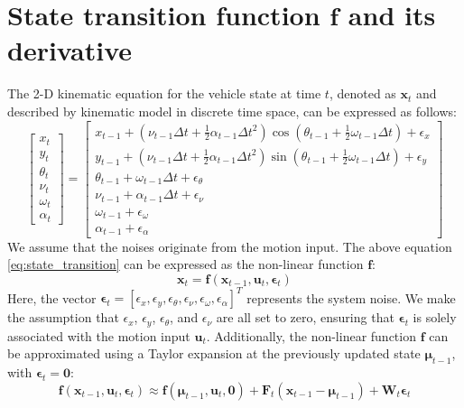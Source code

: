 \documentclass[12pt, a4paper]{article}
\begin{document}
\section{State transition function $\bm{f}$ and its derivative}
The 2-D kinematic equation for the vehicle state at time $t$, denoted as $\bm{x}_t$ and described by kinematic model in discrete time space, can be expressed as follows:
\begin{equation}
  \label{eq:state_transition}
  \begin{bmatrix}
    x_{t}\\
    y_{t}\\
    \theta_{t}\\
    \nu_{t}\\
    \omega_{t}\\
    \alpha_{t}
  \end{bmatrix}=
  \begin{bmatrix}
    x_{t-1} + (\nu_{t-1}\Delta t + \frac{1}{2}\alpha_{t-1}\Delta t^2) \cos(\theta_{t-1}+\frac{1}{2}\omega_{t-1}\Delta t) + \epsilon_{x}\\
    y_{t-1} + (\nu_{t-1}\Delta t + \frac{1}{2}\alpha_{t-1}\Delta t^2) \sin(\theta_{t-1}+\frac{1}{2}\omega_{t-1}\Delta t) + \epsilon_{y}\\
    \theta_{t-1} + \omega_{t-1}\Delta t + \epsilon_{\theta}\\
    \nu_{t-1} + \alpha_{t-1} \Delta t + \epsilon_{\nu}\\
    \omega_{t-1}+\epsilon_{\omega}\\
    \alpha_{t-1}+\epsilon_{\alpha}
  \end{bmatrix}
\end{equation}
We assume that the noises originate from the motion input. The above equation \eqref{eq:state_transition} can be expressed as the non-linear function $\bm{f}$:
\[
  \bm{x}_{t} = \bm{f}(\bm{x}_{t-1}, \bm{u}_{t},\bm{\epsilon}_{t})
\]
Here, the vector $\bm{\epsilon}_{t}=[\epsilon_{x}, \epsilon_{y}, \epsilon_{\theta}, \epsilon_{\nu}, \epsilon_{\omega}, \epsilon_{\alpha}]^{T}$ represents the system noise. We make the assumption that $\epsilon_{x}$, $\epsilon_{y}$, $\epsilon_{\theta}$, and $\epsilon_{\nu}$ are all set to zero, ensuring that $\bm{\epsilon}_{t}$ is solely associated with the motion input $\bm{u}_{t}$. Additionally, the non-linear function $\bm{f}$ can be approximated using a Taylor expansion at the previously updated state $\bm{\mu}_{t-1}$, with $\bm{\epsilon}_{t}=\bm{0}$:
\[
  \bm{f}(\bm{x}_{t-1}, \bm{u}_{t}, \bm{\epsilon}_{t}) \approx \bm{f}(\bm{\mu}_{t-1}, \bm{u}_{t}, \bm{0})+\bm{F}_{t}(\bm{x}_{t-1}-\bm{\mu}_{t-1})+\bm{W}_{t}\bm{\epsilon}_{t}
\]
\end{document}
